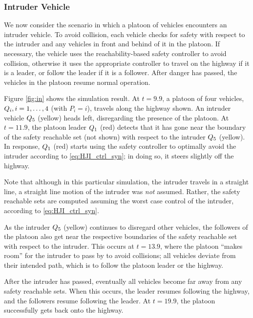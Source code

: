 \subsubsection{Intruder Vehicle}
We now consider the scenario in which a platoon of vehicles encounters an intruder vehicle. To avoid collision, each vehicle checks for safety with respect to the intruder and any vehicles in front and behind of it in the platoon. If necessary, the vehicle uses the reachability-based safety controller to avoid collision, otherwise it uses the appropriate controller to travel on the highway if it is a leader, or follow the leader if it is a follower. After danger has passed, the vehicles in the platoon resume normal operation.

Figure \ref{fig:in} shows the simulation result. At $t=9.9$, a platoon of four vehicles, $Q_{i},i=1,\ldots,4$ (with $P_i = i$), travels along the highway shown. An intruder vehicle $Q_{5}$ (yellow) heads left, disregarding the presence of the platoon. At $t=11.9$, the platoon leader $Q_{1}$ (red) detects that it has gone near the boundary of the safety reachable set (not shown) with respect to the intruder $Q_{5}$ (yellow). In response, $Q_{1}$ (red) starts using the safety controller to optimally avoid the intruder according to \eqref{eq:HJI_ctrl_syn}; in doing so, it steers slightly off the highway. 

Note that although in this particular simulation, the intruder travels in a straight line, a straight line motion of the intruder was \textit{not} assumed. Rather, the safety reachable sets are computed assuming the worst case control of the intruder, according to \eqref{eq:HJI_ctrl_syn}.

As the intruder $Q_{5}$ (yellow) continues to disregard other vehicles, the followers of the platoon also get near the respective boundaries of the safety reachable set with respect to the intruder. This occurs at $t=13.9$, where the platoon ``makes room'' for the intruder to pass by to avoid collisions; all vehicles deviate from their intended path, which is to follow the platoon leader or the highway.

After the intruder has passed, eventually all vehicles become far away from any safety reachable sets. When this occurs, the leader resumes following the highway, and the followers resume following the leader. At $t=19.9$, the platoon successfully gets back onto the highway.


